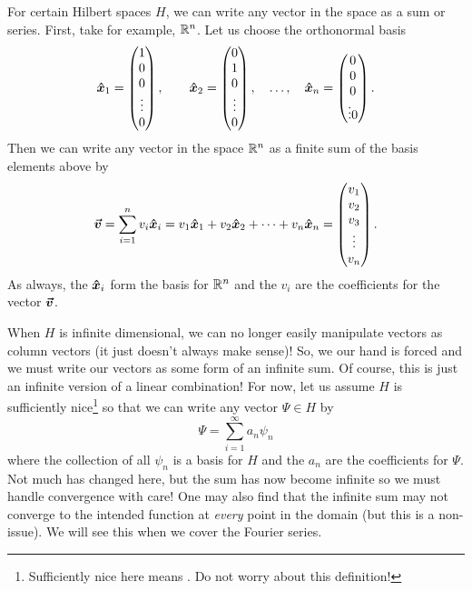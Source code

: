 For certain Hilbert spaces $H$, we can write any vector in the space as a sum or series.  First, take for example, $\mathbb{R}^n$. Let us choose the orthonormal basis
\[
\boldsymbol{\hat{x}}_1 = \begin{pmatrix} 1 \\ 0 \\ 0 \\ \vdots \\ 0 \end{pmatrix}, \qquad \boldsymbol{\hat{x}}_2 = \begin{pmatrix} 0 \\ 1 \\ 0 \\ \vdots \\ 0 \end{pmatrix},\quad \dots, \quad \boldsymbol{\hat{x}}_n = \begin{pmatrix} 0 \\ 0 \\ 0 \\ \vdots 0 \end{pmatrix}.
\]
Then we can write any vector in the space $\mathbb{R}^n$ as a finite sum of the basis elements above by
\[
\boldsymbol{\boldsymbol{\vec{v}}} = \sum_{i=1}^n v_i \boldsymbol{\hat{x}}_i = v_1 \boldsymbol{\hat{x}}_1 + v_2 \boldsymbol{\hat{x}}_2 + \cdots + v_n \boldsymbol{\hat{x}}_n = \begin{pmatrix} v_1 \\ v_2 \\ v_3 \\ \vdots \\ v_n \end{pmatrix}.
\]
As always, the $\boldsymbol{\hat{x}}_i$ form the basis for $\mathbb{R}^n$ and the $v_i$ are the coefficients for the vector $\boldsymbol{\boldsymbol{\vec{v}}}$.

When $H$ is infinite dimensional, we can no longer easily manipulate vectors as column vectors (it just doesn't always make sense)! So, we our hand is forced and we must write our vectors as some form of an infinite sum.  Of course, this is just an infinite version of a linear combination! For now, let us assume $H$ is sufficiently nice\footnote{Sufficiently nice here means . Do not worry about this definition!} so that we can write any vector $\Psi\in H$ by
\[
\Psi = \sum_{i=1}^\infty a_n \psi_n
\]
where the collection of all $\psi_n$ is a basis for $H$ and the $a_n$ are the coefficients for $\Psi$.  Not much has changed here, but the sum has now become infinite so we must handle convergence with care! One may also find that the infinite sum may not converge to the intended function at \emph{every} point in the domain (but this is a non-issue). We will see this when we cover the Fourier series.

